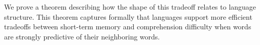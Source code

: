 \documentclass[12pt]{article}
\newcounter{theorem}
\newcommand{\jd}[1]{\textcolor{Red}{[jd: #1]}}
\newcommand{\note}[1]{\textcolor{Red}{[note: #1]}}
\begin{document}
%
%




We prove a theorem describing how the shape of this tradeoff relates to language structure. %
This theorem captures formally that languages support more efficient tradeoffs between short-term memory and comprehension difficulty when words are strongly predictive of their neighboring words.
\end{document}
